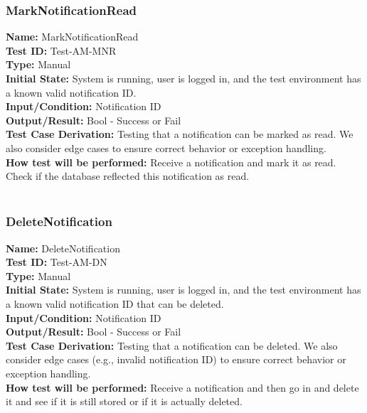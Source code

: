 \documentclass[12pt, titlepage]{article}
\begin{document}
\subsubsection{MarkNotificationRead}
\noindent
\textbf{Name:} MarkNotificationRead \label{itm:Test-AM-MNR} \\
\textbf{Test ID:} Test-AM-MNR \\
\textbf{Type:} Manual \\
\textbf{Initial State:} System is running, user is logged in, and the test environment has a known valid notification ID. \\
\textbf{Input/Condition:} Notification ID \\
\textbf{Output/Result:} Bool - Success or Fail \\
\textbf{Test Case Derivation:} Testing that a notification can be marked as read. We also consider edge cases to ensure correct behavior or exception handling.\\
\textbf{How test will be performed:} Receive a notification and mark it as read. Check if the database reflected this notification as read. \\ \\

\subsubsection{DeleteNotification}
\textbf{Name:} DeleteNotification \label{itm:Test-AM-DN} \\
\textbf{Test ID:} Test-AM-DN \\
\textbf{Type:} Manual \\
\textbf{Initial State:} System is running, user is logged in, and the test environment has a known valid notification ID that can be deleted. \\
\textbf{Input/Condition:} Notification ID \\
\textbf{Output/Result:} Bool - Success or Fail \\
\textbf{Test Case Derivation:} Testing that a notification can be deleted. We also consider edge cases (e.g., invalid notification ID) to ensure correct behavior or exception handling.\\
\textbf{How test will be performed:} Receive a notification and then go in and delete it and see if it is still stored or if it is actually deleted. \\
\end{document}
